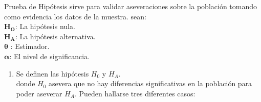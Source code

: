 	\begin{flushleft}
Prueba de Hipótesis sirve para validar aseveraciones sobre la población tomando como evidencia los datos de la muestra.
sean:\\
	
$\pmb{H_O}$: La hipótesis nula.\\
$\pmb{H_A}$: La hipótesis alternativa.\\
$\pmb{\theta}$ : Estimador.\\
$\pmb{\alpha}$: El nivel de significancia.\\

	\end{flushleft}
	\begin{enumerate}
\item	Se definen las hipótesis $H_0$ y $H_A$.\\
		donde $H_0$ asevera que no hay diferencias significativas en la población para poder aseverar $H_A$. Pueden hallarse tres 	diferentes casos:\\



\end{enumerate}
